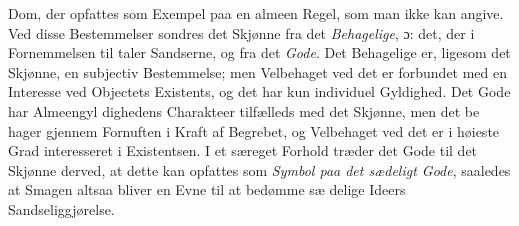 \documentclass[12pt,a4paper]{book}
\begin{document}
Dom, der opfattes som Exempel paa en almeen Regel, som
man ikke kan angive. Ved disse Bestemmelser sondres det
Skjønne fra det \emph{Behagelige}, ɔ: det, der i Fornemmelsen til\-%
taler Sandserne, og fra det \emph{Gode}. Det Behagelige er, ligesom
det Skjønne, en subjectiv Bestemmelse; men Velbehaget ved
det er forbundet med en Interesse ved Objectets Existents, og
det har kun individuel Gyldighed. Det Gode har Almeengyl\-%
dighedens Charakteer tilfælleds med det Skjønne, men det be\-%
hager gjennem Fornuften i Kraft af Begrebet, og Velbehaget
ved det er i høieste Grad interesseret i Existentsen. I et
særeget Forhold træder det Gode til det Skjønne derved, at
dette kan opfattes som \emph{Symbol paa det sædeligt Gode},
saaledes at Smagen altsaa bliver en Evne til at bedømme sæ\-%
delige Ideers Sandseliggjørelse.
\end{document}

